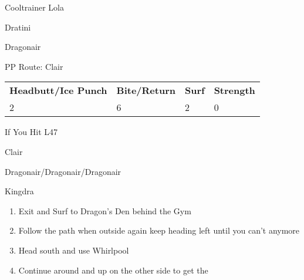 \begin{paracol}{2}
\switchcolumn
\begin{trainer}{Cooltrainer Lola}
	\varwb
	\begin{fightSection}{Dratini}
		\item {} \return
	\end{fightSection}
	\begin{fightSection}{Dragonair}
		\item {} \icePunch
	\end{fightSection}
	\varwe
\end{trainer}

\switchcolumn*
\begin{misc}{PP Route: Clair}
	\varwb
	\begin{tabu} to \textwidth {X[6,c] X[5,c] X[4,c] X[4,c]}
		\textbf{Headbutt/Ice Punch} & \textbf{Bite/Return} & \textbf{Surf} & \textbf{Strength}\\ 
		2 & 6 & 2 & 0
	\end{tabu}
	\varwe
\end{misc}

\begin{misc}{If You Hit L47}
	\varwb
	\begin{notes}
		\item {}
	\end{notes}
	\varwe
\end{misc}

\switchcolumn
\begin{boss}{Clair}
	\varwb
	\begin{fightSection}{Dragonair/Dragonair/Dragonair}
		\item {} \icePunch{} 
	\end{fightSection}
	\begin{fightSection}{Kingdra}
		\item {} \return{} 
	\end{fightSection}
	\varwe
\end{boss}

\begin{enumerate}[resume]
	\item Exit and Surf to Dragon's Den behind the Gym
	\item Follow the path \pointRight{} when outside again keep heading left until you can't anymore
	\item Head south and use Whirlpool
	\item Continue around and up on the other side to get the 
\end{enumerate}


\end{paracol}
